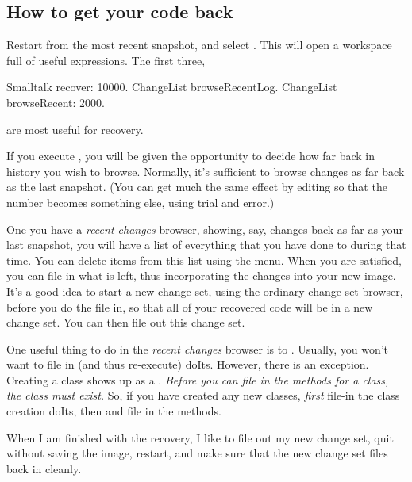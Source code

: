 \documentclass[a4paper,10pt,twoside]{book}
\begin{document}
\subsection{How to get your code back}
Restart \sq from the most recent snapshot, and select . 
This will open a workspace full of useful expressions. The first three,

\begin{code}{}
Smalltalk recover: 10000.
ChangeList browseRecentLog.
ChangeList browseRecent: 2000.
\end{code}

\noindent
are most useful for recovery.

If you execute , you will be given the opportunity to decide how far back in history you wish to browse. 
Normally, it's sufficient to browse changes as far back as the last snapshot. (You can get much the same effect by editing  so that the number  becomes something else, using trial and error.)

One you have a \emph{recent changes} browser, showing, say, changes back as far as your last snapshot, you will have a list of everything that you have done to \sq during that time. 
You can delete items from this list using the  menu.
When you are satisfied, you can file-in what is left, thus incorporating the changes into your new image.
It's a good idea to start a new change set, using the ordinary change set browser, before you do the file in, so that all of your recovered code will be in a new change set. 
You can then file out this change set.

One useful thing to do in the \emph{recent changes} browser is to . 
Usually, you won't want to file in (and thus re-execute) doIts. 
However, there is an exception. 
Creating a class shows up as a .
\emph{Before you can file in the methods for a class, the class must exist.}
So, if you have created any new classes, \emph{first} file-in the class creation doIts, then  and file in the methods.

When I am finished with the recovery, I like to file out my new change set, quit \sq without saving the image, restart, and make sure that the new change set files back in cleanly.
\end{document}
